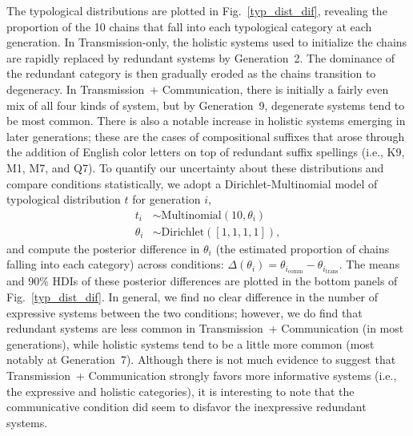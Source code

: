 \documentclass[doc,biblatex]{apa7}
\begin{document}
The typological distributions are plotted in Fig.~\ref{typ_dist_dif}, revealing the proportion of the 10 chains that fall into each typological category at each generation. In Transmission-only, the holistic systems used to initialize the chains are rapidly replaced by redundant systems by Generation~2. The dominance of the redundant category is then gradually eroded as the chains transition to degeneracy. In Transmission~+ Communication, there is initially a fairly even mix of all four kinds of system, but by Generation~9, degenerate systems tend to be most common. There is also a notable increase in holistic systems emerging in later generations; these are the cases of compositional suffixes that arose through the addition of English color letters on top of redundant suffix spellings (i.e., K9, M1, M7, and Q7). To quantify our uncertainty about these distributions and compare conditions statistically, we adopt a Dirichlet-Multinomial model of typological distribution $t$ for generation $i$,
	\begin{equation}
	\begin{aligned}
	   t_i & \sim \mathrm{Multinomial}(10, \theta_i) \\
	   \theta_i & \sim \mathrm{Dirichlet}([1, 1, 1, 1]),
	\end{aligned}
	\end{equation}
and compute the posterior difference in $\theta_i$ (the estimated proportion of chains falling into each category) across conditions: $\Delta(\theta_i) = \theta_{i_\mathrm{comm}} - \theta_{i_\mathrm{trans}}$. The means and 90\% HDIs of these posterior differences are plotted in the bottom panels of Fig.~\ref{typ_dist_dif}. In general, we find no clear difference in the number of expressive systems between the two conditions; however, we do find that redundant systems are less common in Transmission~+ Communication (in most generations), while holistic systems tend to be a little more common (most notably at Generation~7). Although there is not much evidence to suggest that Transmission~+ Communication strongly favors more informative systems (i.e., the expressive and holistic categories), it is interesting to note that the communicative condition did seem to disfavor the inexpressive redundant systems.
\end{document}
